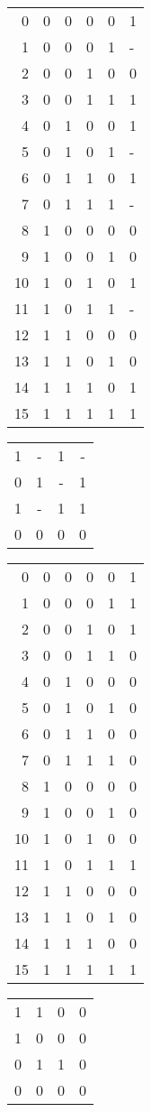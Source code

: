 \documentclass{article}
\begin{document}
\begin{tabular}{r|cccc|l}
	0&0&0&0&0&1\\
	1&0&0&0&1&-\\
	2&0&0&1&0&0\\
	3&0&0&1&1&1\\
	4&0&1&0&0&1\\
	5&0&1&0&1&-\\
	6&0&1&1&0&1\\
	7&0&1&1&1&-\\
	8&1&0&0&0&0\\
	9&1&0&0&1&0\\
	10&1&0&1&0&1\\
	11&1&0&1&1&-\\
	12&1&1&0&0&0\\
	13&1&1&0&1&0\\
	14&1&1&1&0&1\\
	15&1&1&1&1&1\\
\end{tabular}
\begin{tabular}{c|c|c|c}
1&-&1&-\\
0&1&-&1\\
1&-&1&1\\
0&0&0&0\\
\end{tabular}
\begin{tabular}{r|cccc|l}
	0&0&0&0&0&1\\
	1&0&0&0&1&1\\
	2&0&0&1&0&1\\
	3&0&0&1&1&0\\
	4&0&1&0&0&0\\
	5&0&1&0&1&0\\
	6&0&1&1&0&0\\
	7&0&1&1&1&0\\
	8&1&0&0&0&0\\
	9&1&0&0&1&0\\
	10&1&0&1&0&0\\
	11&1&0&1&1&1\\
	12&1&1&0&0&0\\
	13&1&1&0&1&0\\
	14&1&1&1&0&0\\
	15&1&1&1&1&1\\
\end{tabular}
\begin{tabular}{c|c|c|c}
1&1&0&0\\
1&0&0&0\\
0&1&1&0\\
0&0&0&0\\
\end{tabular}
\end{document}
